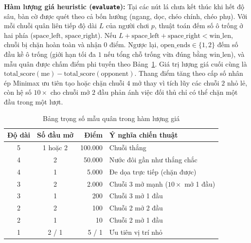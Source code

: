 \documentclass[conference]{IEEEtran}
\begin{document}
\textbf{Hàm lượng giá heuristic (\texttt{evaluate}):} Tại các nút lá chưa kết thúc khi hết độ sâu, bàn cờ được quét theo cả bốn hướng (ngang, dọc, chéo chính, chéo phụ). Với mỗi chuỗi quân liên tiếp độ dài $L$ của người chơi $p$, thuật toán đếm số ô trống ở hai phía ($\text{space\_left}$, $\text{space\_right}$). Nếu $L + \text{space\_left} + \text{space\_right} < \text{win\_len}$, chuỗi bị chặn hoàn toàn và nhận $0$ điểm. Ngược lại, $\text{open\_ends} \in \{1, 2\}$ đếm số đầu kề ô trống (giới hạn tối đa $1$ nếu tổng chỗ trống vừa đúng bằng $\text{win\_len}$), và mẫu quân được chấm điểm phi tuyến theo Bảng~\ref{tab:eval_weights}. Giá trị lượng giá cuối cùng là $\text{total\_score}(\text{me}) - \text{total\_score}(\text{opponent})$. Thang điểm tăng theo cấp số nhân ép Minimax ưu tiên tạo hoặc chặn chuỗi $4$ mở thay vì tích lũy các chuỗi $2$ nhỏ lẻ, còn hệ số $10\times$ cho chuỗi mở $2$ đầu phản ánh việc đối thủ chỉ có thể chặn một đầu trong một lượt.

\begin{table}[t]
\centering
\caption{Bảng trọng số mẫu quân trong hàm lượng giá}
\label{tab:eval_weights}
\begin{tabular}{@{}ccrl@{}}
\toprule
Độ dài & Số đầu mở & Điểm & Ý nghĩa chiến thuật \\
\midrule
5 & 1 hoặc 2 & 100.000 & Chuỗi thắng \\
4 & 2 & 50.000 & Nước đôi gần như thắng chắc \\
4 & 1 & 5.000 & Đe dọa trực tiếp (chặn được) \\
3 & 2 & 2.000 & Chuỗi 3 mở mạnh ($10\times$ mở 1 đầu) \\
3 & 1 & 200 & Chuỗi 3 mở 1 đầu \\
2 & 2 & 100 & Chuỗi 2 mở 2 đầu \\
2 & 1 & 10 & Chuỗi 2 mở 1 đầu \\
1 & 2 / 1 & 5 / 1 & Ưu tiên vị trí nhỏ \\
\bottomrule
\end{tabular}
\end{table}
\end{document}
